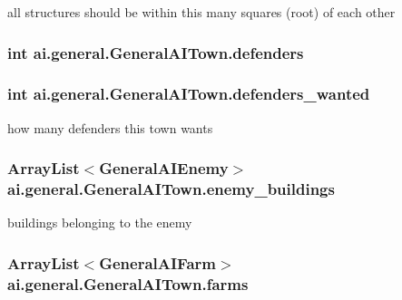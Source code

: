 \label{classai_1_1general_1_1_general_a_i_town_a89768a3f505f2978a615031e26b3a936}
all structures should be within this many squares (root) of each other \hypertarget{classai_1_1general_1_1_general_a_i_town_a5a21a3abfa24a898efb8da41576de31e}{
\subsubsection[{defenders}]{\setlength{\rightskip}{0pt plus 5cm}int {\bf ai.general.GeneralAITown.defenders}}}
\label{classai_1_1general_1_1_general_a_i_town_a5a21a3abfa24a898efb8da41576de31e}
\hypertarget{classai_1_1general_1_1_general_a_i_town_ae48c777b4279a86050c7150a035ec2d8}{
\subsubsection[{defenders\_\-wanted}]{\setlength{\rightskip}{0pt plus 5cm}int {\bf ai.general.GeneralAITown.defenders\_\-wanted}}}
\label{classai_1_1general_1_1_general_a_i_town_ae48c777b4279a86050c7150a035ec2d8}
how many defenders this town wants \hypertarget{classai_1_1general_1_1_general_a_i_town_a91cd92b61de687c024e0c548de5a0c9c}{
\subsubsection[{enemy\_\-buildings}]{\setlength{\rightskip}{0pt plus 5cm}ArrayList$<${\bf GeneralAIEnemy}$>$ {\bf ai.general.GeneralAITown.enemy\_\-buildings}}}
\label{classai_1_1general_1_1_general_a_i_town_a91cd92b61de687c024e0c548de5a0c9c}
buildings belonging to the enemy \hypertarget{classai_1_1general_1_1_general_a_i_town_ac5bd96d862c3a343ac10ec425264bb40}{
\subsubsection[{farms}]{\setlength{\rightskip}{0pt plus 5cm}ArrayList$<${\bf GeneralAIFarm}$>$ {\bf ai.general.GeneralAITown.farms}}}
